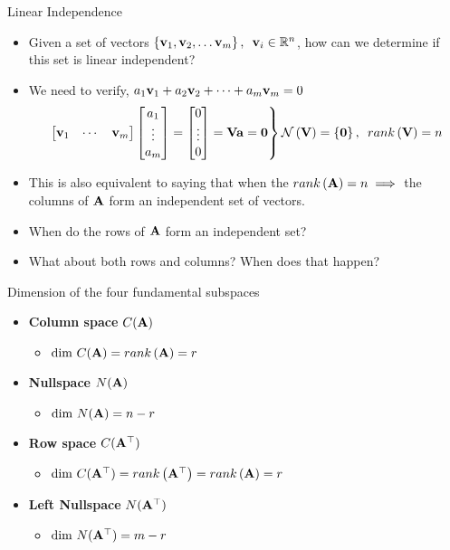 \documentclass[aspectratio=169]{beamer}
\let\olditem\item
\renewcommand{\item}{\setlength{\itemsep}{\fill}\olditem}
\def\mf{\ensuremath\mathbf}
\begin{document}
\begin{frame}[t]{Linear Independence}
\begin{itemize}
    \item Given a set of vectors $\left\{\mf{v}_1, \mf{v}_2, \ldots \mf{v}_m\right\}, \,\,\, \mf{v}_i \in \mathbb{R}^n$, how can we determine if this set is linear independent?
    \item We need to verify, $a_1 \mf{v}_1 + a_2 \mf{v}_2 + \cdots + a_m \mf{v}_m= 0$
    \[ \begin{rcases*}\begin{bmatrix} \mf{v}_1 & \cdots & \mf{v}_m\end{bmatrix} \begin{bmatrix} a_1 \\ \vdots \\ a_m\end{bmatrix} = \begin{bmatrix} 0 \\ \vdots \\ 0\end{bmatrix} = \mf{V}\mf{a} = \mf{0}\end{rcases*} \mathcal{N}\left(\mf{V}\right) = \left\{\mf{0}\right\}, \,\,\, rank\left(\mf{V}\right) = n  \]
    \item This is also equivalent to saying that when the $rank \left(\mf{A}\right) = n \implies$ the columns of $\mf{A}$ form an independent set of vectors.
    \item When do the rows of $\mf{A}$ form an independent set?
    \item What about both rows and columns? When does that happen?
\end{itemize}
\end{frame}


\begin{frame}[t]{Dimension of the four fundamental subspaces}
\begin{itemize}
    \item \textbf{Column space} $C(\mf{A})$
    \begin{itemize}
        \item $\dim \,C(\mf{A}) = rank\left(\mf{A}\right) = r$
    \end{itemize}
    \item \textbf{Nullspace} $N(\mf{A})$
    \begin{itemize}
        \item $\dim \,N(\mf{A}) = n-r$
    \end{itemize}
    \item \textbf{Row space} $C(\mf{A}^{\top})$
    \begin{itemize}
        \item $\dim \,C(\mf{A}^{\top}) = rank\left(\mf{A}^{\top}\right) = rank\left(\mf{A}\right) = r$
    \end{itemize}
    \item \textbf{Left Nullspace} $N(\mf{A}^{\top})$
    \begin{itemize}
        \item $\dim \,N(\mf{A}^{\top}) = m-r$
    \end{itemize}
\end{itemize}
\end{frame}
\end{document}
